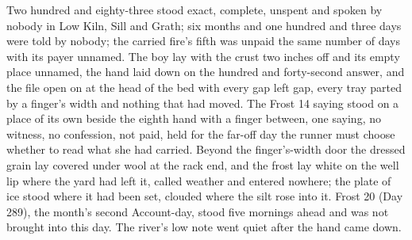Two hundred and eighty-three stood exact, complete, unspent and spoken by nobody in Low Kiln, Sill and Grath; six months and one hundred and three days were told by nobody; the carried fire's fifth was unpaid the same number of days with its payer unnamed. The boy lay with the crust two inches off and its empty place unnamed, the hand laid down on the hundred and forty-second answer, and the file open on  at the head of the bed with every gap left gap, every tray parted by a finger's width and nothing that had moved. The Frost 14 saying stood on a place of its own beside the eighth hand with a finger between, one saying, no witness, no confession, not paid, held for the far-off day the runner must choose whether to read what she had carried. Beyond the finger's-width door the dressed grain lay covered under wool at the rack end, and the frost lay white on the well lip where the yard had left it, called weather and entered nowhere; the plate of ice stood where it had been set, clouded where the silt rose into it. Frost 20 (Day 289), the month's second Account-day, stood five mornings ahead and was not brought into this day. The river's low note went quiet after the hand came down.
